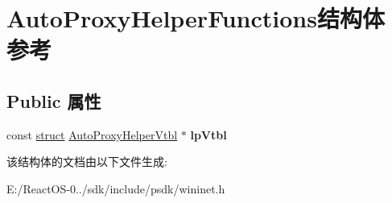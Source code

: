 \hypertarget{struct_auto_proxy_helper_functions}{}\section{Auto\+Proxy\+Helper\+Functions结构体 参考}
\label{struct_auto_proxy_helper_functions}
\subsection*{Public 属性}
\begin{DoxyCompactItemize}
\item 
\mbox{\label{struct_auto_proxy_helper_functions_acafcd7398792dab188877741d197b7f6}} 
const \hyperlink{interfacestruct}{struct} \hyperlink{struct_auto_proxy_helper_vtbl}{Auto\+Proxy\+Helper\+Vtbl} $\ast$ {\bfseries lp\+Vtbl}
\end{DoxyCompactItemize}


该结构体的文档由以下文件生成\+:\begin{DoxyCompactItemize}
\item 
E\+:/\+React\+O\+S-\/0../sdk/include/psdk/wininet.\+h\end{DoxyCompactItemize}
